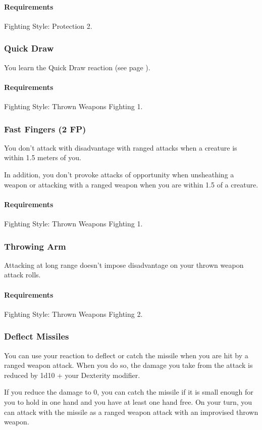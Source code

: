     \paragraph{Requirements} Fighting Style: Protection 2.
\subsubsection{Quick Draw} \label{feat::quickdraw}
    You learn the Quick Draw reaction (see page \pageref{act::quickdraw}).
    \paragraph{Requirements} Fighting Style: Thrown Weapons Fighting 1.
\subsubsection{Fast Fingers (2 FP)} \label{feat::fastfingers}
    You don't attack with disadvantage with ranged attacks when a creature is within 1.5 meters of you.

    In addition, you don't provoke attacks of opportunity when unsheathing a weapon or attacking with a ranged weapon when you are within 1.5 of a creature.
    \paragraph{Requirements} Fighting Style: Thrown Weapons Fighting 1.
\subsubsection{Throwing Arm} \label{feat::throwingarm}
    Attacking at long range doesn't impose disadvantage on your thrown weapon attack rolls.
    \paragraph{Requirements} Fighting Style: Thrown Weapons Fighting 2.
\subsubsection{Deflect Missiles} \label{feat::deflectmissiles}
    You can use your reaction to deflect or catch the missile when you are hit by a ranged weapon attack.
    When you do so, the damage you take from the attack is reduced by 1d10 + your Dexterity modifier.

    If you reduce the damage to 0, you can catch the missile if it is small enough for you to hold in one hand and you have at least one hand free.
    On your turn, you can attack with the missile as a ranged weapon attack with an improvised thrown weapon.

